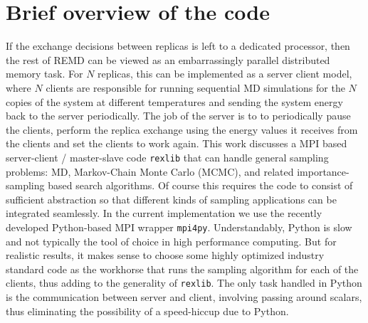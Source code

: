 \documentclass[12pt,letterpaper]{article}
\begin{document}
\section*{Brief overview of the code}
\noindent If the exchange decisions between replicas is left to a dedicated processor, then the rest of REMD can be viewed as an embarrassingly parallel distributed memory task. For $N$ replicas, this can be implemented as a server client model, where $N$ clients are responsible for running sequential MD simulations for the $N$ copies of the system at different temperatures and sending the system energy back to the server periodically. The job of the server is to to periodically pause the clients, perform the replica exchange using the energy values it receives from the clients and set the clients to work again. This work discusses a MPI based server-client / master-slave code \texttt{rexlib} that can handle general sampling problems: MD, Markov-Chain Monte Carlo (MCMC), and related importance-sampling based search algorithms. Of course this requires the code to consist of sufficient abstraction so that different kinds of sampling applications can be integrated seamlessly. In the current implementation we use the recently developed Python-based MPI wrapper 
\texttt{mpi4py}\cite{mpi4py}. Understandably, Python is slow and not typically the tool of choice in high performance computing. But for realistic results, it makes sense to choose some highly optimized industry standard code as the workhorse that runs the sampling algorithm for each of the clients, thus adding to the generality of \texttt{rexlib}. The only task handled in Python is the communication between server and client, involving passing around scalars, thus eliminating the possibility of a speed-hiccup due to Python.\\
\end{document}
